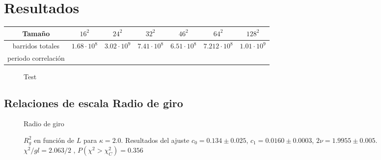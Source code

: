 \chapter{Resultados}



\begin{table}[h]
\begin{tabular}{|c|c|c|c|c|c|c|}
Tamaño & $16^2$ & $24^2$ & $32^2$ & $46^2$ & $64^2$ & $128^2$ \\ \hline 
barridos totales & $1.68\cdot 10^8$& $3.02\cdot 10^9$ & $7.41\cdot 10^8$ &
$6.51\cdot 10^8$&$7.212\cdot 10^8$ &$1.01\cdot10^9$\\
periodo correlación & 
\end{tabular}
\end{table}


 \begin{figure}[h]
 \centering
  
 \caption{Test}
 \end{figure}

\section{Relaciones de escala Radio de giro}

\begin{figure}[h]
  \centering
  
  \caption{Radio de giro}
\end{figure}

\begin{figure}[h]
  \centering
  
  \caption{$R^2_g$ en función de $L$ para $\kappa=2.0$. Resultados del ajuste
    $c_0=0.134\pm 0.025$, $c_1=0.0160\pm 0.0003$, $2\nu=1.9955 \pm
    0.005$. $\chi^2/gl=2.063/2$ , $P(\chi^2>\chi_C^2)=0.356$}







\end{figure}



